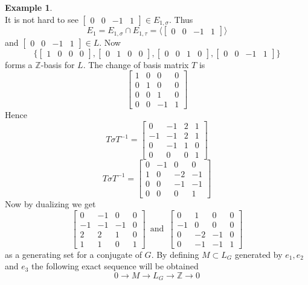 \documentclass{article}
\theoremstyle{plain}
\theoremstyle{definition}
\newtheorem{example}[theorem]{Example}
\newcommand{\Z}{\ensuremath{\mathbb{Z}}}
\newcommand{\tand}{\ensuremath{\,\,\, \text{and} \,\,\,}}
\begin{document}
\begin{example}
\\It is not hard to see $\begin{bmatrix}
0& 0 &-1 &1
\end{bmatrix}\in E_{1,\sigma}$. Thus $$E_1 = E_{1,\sigma} \cap E_{1,\tau} = \langle \begin{bmatrix}
0& 0 &-1 &1
\end{bmatrix} \rangle$$
and $ \begin{bmatrix}
0& 0 &-1 &1
\end{bmatrix}\in L$. Now $$\lbrace  \begin{bmatrix}
1& 0 &0 &0
\end{bmatrix} ,  \begin{bmatrix}
0& 1 &0 &0
\end{bmatrix},  \begin{bmatrix}
0& 0 &1 &0
\end{bmatrix},  \begin{bmatrix}
0& 0 &-1 &1
\end{bmatrix} \rbrace$$ forms a $\Z$-basis for $L$. The change of basis matrix $T$ is 
$$
\begin{bmatrix}
1 & 0 &0 &0\\
0 & 1 &0 &0\\
0 & 0 &1 &0\\
0 & 0 &-1 &1
\end{bmatrix}
$$ Hence 
$$
T \sigma T^{-1}= \left[ \begin {array}{ccc|c} 0&-1&2&1\\ -1&-1&2&1
\\ 0&-1&1&0\\ \hline 0&0&0&1\end {array}
 \right] 
$$
$$
T\sigma T^{-1}=  \left[ \begin {array}{ccc|c} 0&-1&0&0\\ 1&0&-2&-1
\\ 0&0&-1&-1\\ \hline 0&0&0&1\end {array}
 \right] 
$$
Now by dualizing we get 
$$
 \left[ \begin {array}{ccc|c} 0&-1&0&0\\ -1&-1&-1&0
\\ 2&2&1&0\\ \hline 1&1&0&1\end {array}
 \right]
 \tand 
 \left[ \begin {array}{ccc|c} 0&1&0&0\\ -1&0&0&0
\\ 0&-2&-1&0\\ \hline 0&-1&-1&1
\end {array} \right] 
$$ 
as a generating set for a conjugate of $G$. By defining $M\subset L_G$ generated by $e_1, e_2$ and $e_3$ the following exact sequence will be obtained
$$
0 \longrightarrow M \longrightarrow L_G \longrightarrow \Z \longrightarrow 0
$$ 
\end{example}
\end{document}
